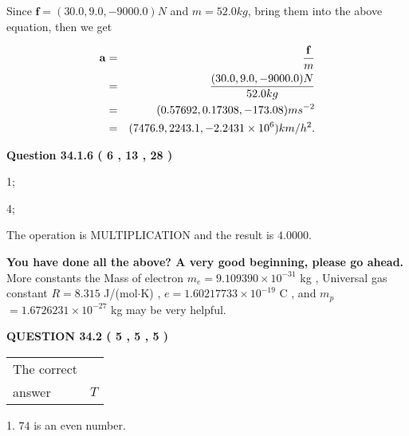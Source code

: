 \documentclass[12pt]{article}
\begin{document}
Since $\mathbf{f}=( %
30.0,  %
9.0,  %
-9000.0 )N$
and $m= %
52.0 kg$, bring them into the above equation, then we get
 
\begin{eqnarray*}
\mathbf{a}&=&\frac{\mathbf{f}}m  \\
&=&\frac{(
30.0 ,
9.0 ,
-9000.0 )N
}{ %
52.0 kg}  \\
&=&(
0.57692 ,
0.17308,
-173.08
)ms^{-2} \\
&=&(
7476.9 ,
2243.1 ,
-2.2431 \times 10^{6}
)km/h^2.
\end{eqnarray*}
 
 
 
  
\vspace{0.2in}
  
{\textbf{\Large{Question
34.1.6 
 (           6 ,          13 ,          28 )
}}}
  
  
 
 
\noindent{}

1;
 
4;
 
The operation is  %
MULTIPLICATION and the result is
$ %
4.0000$.
 
 
 
   
   
\vspace{0.3in}
{\textbf{\LARGE{You have done all the above? A very good beginning, please go ahead.}}}
More constants the
Mass of electron
$m_e$$ =
9.109390 \times 10^{-31} $
kg
,
Universal gas constant
$R$$ =
8.315 $
J/(mol$\cdot $K)
,
$e$$ =
1.60217733 \times 10^{-19} $
C
, and
$m_p$$ =
1.6726231 \times 10^{-27} $
kg
%
may be very helpful.
\vspace{0.3in}
   
   
  
\vspace{0.2in}
  
{\textbf{\Large{QUESTION
34.2 
 (           5 ,           5 ,           5 )
}}}
  
  
 
 
\noindent{}

 
\noindent\begin{tabular}{|l|l|}\hline The correct & \\
          answer &  %
$T$ \\ \hline \end{tabular}
1. $ %
74$ is an  %
even number.
 
\end{document}
